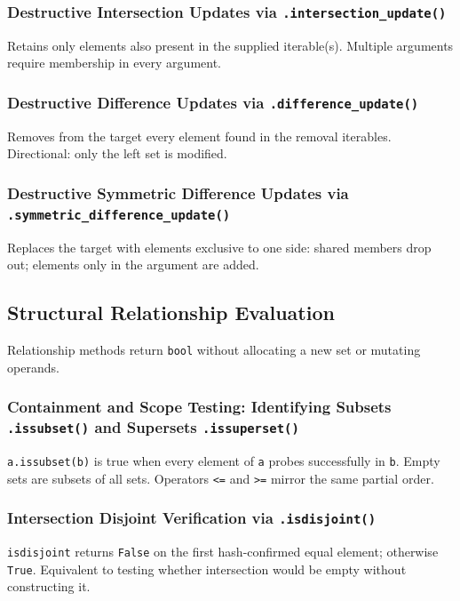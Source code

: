 \documentclass[a4paper,twoside]{report}
\begin{document}
\subsubsection{Destructive Intersection Updates via \texttt{.intersection\_update()}}

Retains only elements also present in the supplied iterable(s). Multiple arguments require membership in every argument.

\subsubsection{Destructive Difference Updates via \texttt{.difference\_update()}}

Removes from the target every element found in the removal iterables. Directional: only the left set is modified.

\subsubsection{Destructive Symmetric Difference Updates via \texttt{.symmetric\_difference\_update()}}

Replaces the target with elements exclusive to one side: shared members drop out; elements only in the argument are added.


\subsection{Structural Relationship Evaluation}

Relationship methods return \texttt{bool} without allocating a new set or mutating operands.

\subsubsection{Containment and Scope Testing: Identifying Subsets \texttt{.issubset()} and Supersets \texttt{.issuperset()}}

\texttt{a.issubset(b)} is true when every element of \texttt{a} probes successfully in \texttt{b}. Empty sets are subsets of all sets. Operators \texttt{<=} and \texttt{>=} mirror the same partial order.

\subsubsection{Intersection Disjoint Verification via \texttt{.isdisjoint()}}

\texttt{isdisjoint} returns \texttt{False} on the first hash-confirmed equal element; otherwise \texttt{True}. Equivalent to testing whether intersection would be empty without constructing it.
\end{document}
